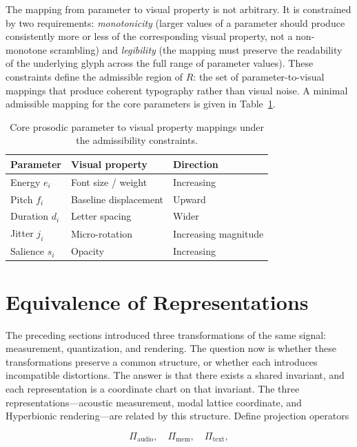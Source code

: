 \documentclass[12pt, a4paper]{article}
\begin{document}
The mapping from parameter to visual property is not arbitrary. It is constrained by two requirements: \emph{monotonicity} (larger values of a parameter should produce consistently more or less of the corresponding visual property, not a non-monotone scrambling) and \emph{legibility} (the mapping must preserve the readability of the underlying glyph across the full range of parameter values). These constraints define the admissible region of $R$: the set of parameter-to-visual mappings that produce coherent typography rather than visual noise. A minimal admissible mapping for the core parameters is given in Table~\ref{tab:mapping}.

\begin{table}[h]
\centering
\begin{tabular}{lll}
\hline
\textbf{Parameter} & \textbf{Visual property} & \textbf{Direction} \\
\hline
Energy $e_i$ & Font size / weight & Increasing \\
Pitch $f_i$ & Baseline displacement & Upward \\
Duration $d_i$ & Letter spacing & Wider \\
Jitter $j_i$ & Micro-rotation & Increasing magnitude \\
Salience $s_i$ & Opacity & Increasing \\
\hline
\end{tabular}
\caption{Core prosodic parameter to visual property mappings under the admissibility constraints.}
\label{tab:mapping}
\end{table}

\section{Equivalence of Representations}

The preceding sections introduced three transformations of the same signal: measurement, quantization, and rendering. The question now is whether these transformations preserve a common structure, or whether each introduces incompatible distortions. The answer is that there exists a shared invariant, and each representation is a coordinate chart on that invariant. The three representations---acoustic measurement, modal lattice coordinate, and Hyperbionic rendering---are related by this structure. Define projection operators

\begin{equation}
\Pi_{\mathrm{audio}},\quad \Pi_{\mathrm{mem}},\quad \Pi_{\mathrm{text}},
\label{eq:projections}
\end{equation}
\end{document}
